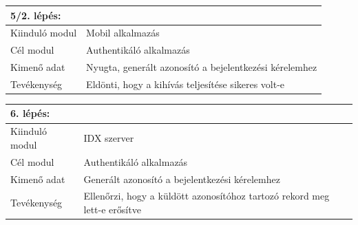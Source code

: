 \begin{tabular}{|p{3cm}|p{10cm} |}
   	\hline
	\textbf{5/2. lépés:} & \textbf{}\\ \hline
	Kiinduló modul & Mobil alkalmazás \\ \hline
	Cél modul & Authentikáló alkalmazás \\ \hline
	Kimenő adat & Nyugta, generált azonosító a bejelentkezési kérelemhez  \\ \hline
	Tevékenység & Eldönti, hogy a kihívás teljesítése sikeres volt-e\\ \hline
\end{tabular}

\begin{tabular}{|p{3cm}|p{10cm} |}
   	\hline
	\textbf{6. lépés:} & \textbf{}\\ \hline
	Kiinduló modul & IDX szerver \\ \hline
	Cél modul & Authentikáló alkalmazás \\ \hline
	Kimenő adat & Generált azonosító a bejelentkezési kérelemhez \\ \hline
	Tevékenység & Ellenőrzi, hogy a küldött azonosítóhoz tartozó rekord meg lett-e erősítve\\ \hline
\end{tabular}